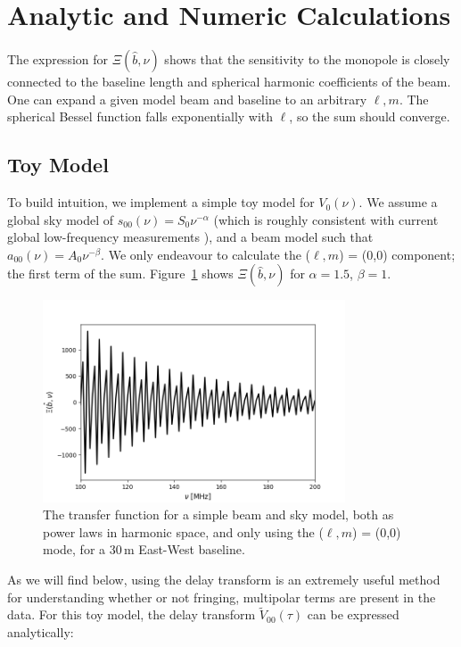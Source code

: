 \section{Analytic and Numeric Calculations}

The expression for $\Xi(\hat{b},\nu)$ shows that the sensitivity to the monopole is closely connected to the baseline length and spherical harmonic coefficients of the beam. One can expand a given model beam and baseline to an arbitrary $\ell, m$. The spherical Bessel function falls exponentially with $\ell$, so the sum should converge.

\subsection{Toy Model}

To build intuition, we implement a simple toy model for $V_0(\nu)$. We assume a global sky model of $s_{00}(\nu) = S_0\nu^{-\alpha}$ (which is roughly consistent with current global low-frequency measurements \citealt{Mozden.17}), and a beam model such that $a_{00}(\nu) = A_0\nu^{-\beta}$. We only endeavour to calculate the ($\ell,m$) = (0,0) component; the first term of the sum. Figure~\ref{fig:xi_toy} shows $\Xi(\hat{b},\nu)$ for $\alpha=1.5$, $\beta = 1$. 

\begin{figure}
\centering
\includegraphics[width=0.8\textwidth]{chapters/global_signal/figures/xi_toy.png}
\caption[The transfer function for a simple beam and sky model.]{The transfer function for a simple beam and sky model, both as power laws in harmonic space, and only using the ($\ell,m$) = (0,0) mode, for a 30\,m East-West baseline.}
\label{fig:xi_toy}
\end{figure}

As we will find below, using the delay transform \citep{Parsons.12b} is an extremely useful method for understanding whether or not fringing, multipolar terms are present in the data. For this toy model, the delay transform $\tilde{V}_{00}(\tau)$ can be expressed analytically:

